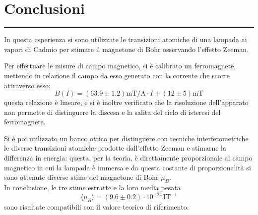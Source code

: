 
{\centering
\section{Conclusioni}
}
\medskip
{\color{gray}\hrule}
\medskip
In questa esperienza si sono utilizzate le transizioni atomiche di una lampada ai vapori di Cadmio 
per stimare il magnetone di Bohr osservando l'effetto Zeeman.

Per effettuare le misure di campo magnetico, si è calibrato un ferromagnete, mettendo in relazione il campo da esso generato con la corrente che scorre attraverso esso: 
$$B(I) = (63.9\pm1.2)\text{mT/A}\cdot I + (12\pm5)\text{mT}$$
questa relazione è lineare, e si è inoltre verificato che la risoluzione dell'apparato non permette di distinguere la discesa e la salita del ciclo di isteresi del ferromagnete.

Si è poi utilizzato un banco ottico per distinguere con tecniche interferometriche le diverse transizioni atomiche prodotte dall'effetto Zeeman e stimarne la differenza in energia: questa, per la teoria, è direttamente proporzionale al campo magnetico in cui la lampada è immersa e da questa costante di proporzionalità si sono ottenute diverse stime del magnetone di Bohr $\mu_B$.\\
In conclusione, le tre stime estratte e la loro media pesata
$$\langle\mu_B\rangle = (9.6\pm0.2)\cdot10^{-24}\text{JT}^{-1}$$
sono risultate compatibili con il valore teorico di riferimento.